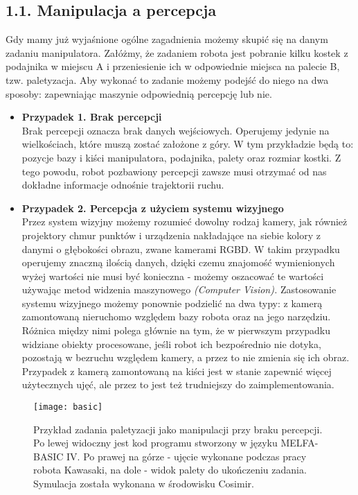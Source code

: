 \documentclass{article}
\begin{document}
\subsection*{\LARGE{1.1. Manipulacja a percepcja}} 

Gdy mamy już wyjaśnione ogólne zagadnienia możemy skupić się na danym zadaniu manipulatora. Załóżmy, że zadaniem robota jest pobranie kilku kostek z podajnika w miejscu A i przeniesienie ich w odpowiednie miejsca na palecie B, tzw. paletyzacja. Aby wykonać to zadanie możemy podejść do niego na dwa sposoby: zapewniając maszynie odpowiednią percepcję lub nie. 

\begin{itemize}
\item \textbf{Przypadek 1. Brak percepcji} \\
Brak percepcji oznacza brak danych wejściowych. Operujemy jedynie na wielkościach, które muszą zostać założone z góry. W tym przykładzie będą to: pozycje bazy i kiści manipulatora, podajnika, palety oraz rozmiar kostki. Z tego powodu, robot pozbawiony percepcji zawsze musi otrzymać od nas dokładne informacje odnośnie trajektorii ruchu.

\item \textbf{Przypadek 2. Percepcja z użyciem systemu wizyjnego} \\
Przez system wizyjny możemy rozumieć dowolny rodzaj kamery, jak również projektory chmur punktów i urządzenia nakładające na siebie kolory z danymi o głębokości obrazu, zwane kamerami RGBD. W takim przypadku operujemy znaczną ilością danych, dzięki czemu znajomość wymienionych wyżej wartości nie musi być konieczna - możemy oszacować te wartości używając metod widzenia maszynowego \emph{(Computer Vision).} Zastosowanie systemu wizyjnego możemy ponownie podzielić na dwa typy: z kamerą zamontowaną nieruchomo względem bazy robota oraz na jego narzędziu. Różnica między nimi polega głównie na tym, że w pierwszym przypadku widziane obiekty procesowane, jeśli robot ich bezpośrednio nie dotyka, pozostają w bezruchu względem kamery, a przez to nie zmienia się ich obraz. Przypadek z kamerą zamontowaną na kiści jest w stanie zapewnić więcej użytecznych ujęć, ale przez to jest też trudniejszy do zaimplementowania.
\end{itemize}

\begin{figure}[h]
\texttt{[image: basic]}
\caption{Przykład zadania paletyzacji jako manipulacji przy braku percepcji. Po lewej widoczny jest kod programu stworzony w języku MELFA-BASIC IV. Po prawej na górze - ujęcie wykonane podczas pracy robota Kawasaki, na dole - widok palety do ukończeniu zadania. Symulacja została wykonana w środowisku Cosimir.}
\end{figure}
\end{document}
